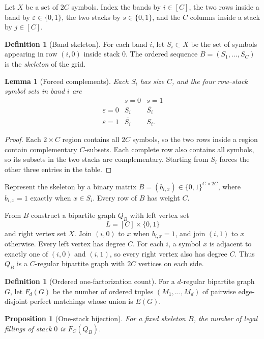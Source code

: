 \documentclass[11pt]{article}
\newtheorem{proposition}[theorem]{Proposition}
\newtheorem{lemma}[theorem]{Lemma}
\theoremstyle{definition}
\newtheorem{definition}[theorem]{Definition}
\theoremstyle{remark}
\newcommand{\comp}[1]{\overline{#1}}
\begin{document}
Let $X$ be a set of $2C$ symbols.  Index the bands by $i\in[C]$, the two rows
inside a band by $\varepsilon\in\{0,1\}$, the two stacks by
$s\in\{0,1\}$, and the $C$ columns inside a stack by $j\in[C]$.

\begin{definition}[Band skeleton]
For each band $i$, let $S_i\subset X$ be the set of symbols appearing in row
$(i,0)$ inside stack $0$.  The ordered sequence
$B=(S_1,\ldots,S_C)$ is the \emph{skeleton} of the grid.
\end{definition}

\begin{lemma}[Forced complements]
Each $S_i$ has size $C$, and the four row--stack symbol sets in band $i$ are
\[
\begin{array}{c|cc}
 & s=0 & s=1\\ \hline
\varepsilon=0 & S_i & \comp{S_i}\\
\varepsilon=1 & \comp{S_i} & S_i.
\end{array}
\]
\end{lemma}

\begin{proof}
Each $2\times C$ region contains all $2C$ symbols, so the two rows inside a
region contain complementary $C$-subsets.  Each complete row also contains
all symbols, so its subsets in the two stacks are complementary.  Starting
from $S_i$ forces the other three entries in the table.
\end{proof}

Represent the skeleton by a binary matrix
$B=(b_{i,x})\in\{0,1\}^{C\times2C}$, where $b_{i,x}=1$ exactly when
$x\in S_i$.  Every row of $B$ has weight $C$.

From $B$ construct a bipartite graph $Q_B$ with left vertex set
\[
  L=[C]\times\{0,1\}
\]
and right vertex set $X$.  Join $(i,0)$ to $x$ when $b_{i,x}=1$, and join
$(i,1)$ to $x$ otherwise.  Every left vertex has degree $C$.  For each
$i$, a symbol $x$ is adjacent to exactly one of $(i,0)$ and $(i,1)$, so every
right vertex also has degree $C$.  Thus $Q_B$ is a $C$-regular bipartite
graph with $2C$ vertices on each side.

\begin{definition}[Ordered one-factorization count]
For a $d$-regular bipartite graph $G$, let $F_d(G)$ be the number of ordered
tuples $(M_1,\ldots,M_d)$ of pairwise edge-disjoint perfect matchings whose
union is $E(G)$.
\end{definition}

\begin{proposition}[One-stack bijection]
For a fixed skeleton $B$, the number of legal fillings of stack $0$ is
$F_C(Q_B)$.
\end{proposition}
\end{document}
